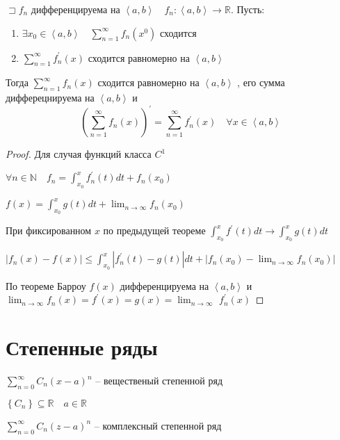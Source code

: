 \documentclass{book}
\newcommand\N{\ensuremath{\mathbb{N}}}
\newcommand\R{\ensuremath{\mathbb{R}}}
\newcommand{\p}[1]{#1^{\prime}}
\theoremstyle{definition}
\begin{document}
    \begin{theorem}

        $\sqsupset f_n$ дифференцируема на $\left<a,b \right>\quad f_n: \left<a,b \right>\to \R$. Пусть:
        \begin{enumerate}
            \item $\exists x_0\in \left<a,b \right>\quad \sum_{n=1}^{\infty } f_n(x^0)$ сходится
            \item $\sum_{n=1}^{\infty } \p f_n(x)$ сходится равномерно на $\left<a,b \right>$
        \end{enumerate}

        Тогда $\sum_{n=1}^{\infty } f_n\left( x \right) $ сходится равномерно на $\left<a,b \right>$ , его сумма дифферецнируема на $\left<a,b \right>$ и \[\p {\left( \sum_{n=1}^{\infty } f_n(x) \right) } = \sum_{n=1}^{\infty } \p f_n(x)\quad \forall x\in \left<a,b \right>\]
    \end{theorem}
    \begin{proof}
        Для случая функций класса $C^1$

        $\forall n\in \N \quad f_n = \int_{x_0}^x \p f_n(t)dt + f_n(x_0)$

        $f(x) = \int_{x_0}^x g(t)dt + \lim_{n \to \infty} f_n(x_0)$ 

        При фиксированном $x$ по предыдущей теореме $\int_{x_0}^x\p f(t)dt \to \int_{x_0}^x g(t)dt$

        $\left| f_n(x) - f(x) \right| \leqslant \int_{x_0}^x \left| \p f_n(t) - g(t) \right| dt + \left| f_n(x_0) - \lim_{n \to \infty} f_n(x_0) \right| $

        По теореме Барроу $f(x)$ дифференцируема на $\left<a,b \right>$ и $\lim_{n \to \infty} f_n(x) = \p f(x) = g(x) = \lim_{n \to \infty} $ $\p f_n(x)$
    \end{proof}

    \section{Степенные ряды}

    $\sum_{n=0}^{\infty } C_n \left( x-a \right) ^n$ -- вещественый степенной ряд

    $\left\{ C_n \right\} \subseteq \R\quad a\in \R$

    $\sum_{n=0}^{\infty } C_n \left( z-a \right) ^n$ -- комплексный степенной ряд
\end{document}
